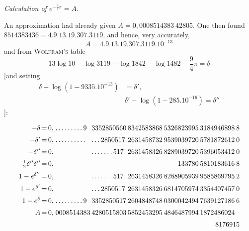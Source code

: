 \begingroup
\renewcommand{\arraystretch}{1.45}
\par{}

\begin{center}\emph{Calculation of $e^{-\frac94\pi}=A$.}\end{center}

An approximation had already given $A=0{,}0008514383\ 42805$. One then found
$8514383436=4.9.13.19.307.3119$, and hence, very accurately,
\[
A=4.9.13.19.307.3119.10^{-13}
\]
and from \textsc{Wolfram's} table
\[
13\log10-\log3119-\log1842-\log1482-\frac94\pi=\delta
\]
[and setting
\[
\begin{aligned}\delta-\log(1-9335.10^{-13})&=\delta',\\[7pt]&
\delta'-\log(1-285.10^{-16})=\delta''\end{aligned}
\]
]:

\begingroup\footnotesize\setlength{\arraycolsep}{1pt}\renewcommand{\arraystretch}{1.12}\[
\begin{array}{r@{\,=\,}r@{\;}l@{\hspace{2pt}}l@{\hspace{2pt}}l@{\hspace{2pt}}l@{\hspace{2pt}}l@{\hspace{2pt}}l}
-\delta & 0{,} & .\,.\,.\,.\,.\,.\,.\,.\,.\,9 & 3352850560 & 8342583868 & 5326823995 & 3184946898 & 8\\[5pt]
-\delta' & 0{,} & .\,.\,.\,.\,.\,.\,.\,.\,.\,. & .\,.\,.\,2850517 & 2631458732 & 9539039720 & 5781872612 & 0\\[5pt]
-\delta'' & 0{,} &  & .\,.\,.\,.\,.\,.\,.\,517 & 2631458326 & 8289039720 & 5396053412 & 0\\[5pt]
\tfrac12\delta''\delta'' & 0{,} &  &  &  & \phantom{0000}133780 & 5810183616 & 8\\[5pt]
1-e^{\delta''} & 0{,} &  & .\,.\,.\,.\,.\,.\,.\,517 & 2631458326 & 8288905939 & 9585869795 & 2\\[5pt]
1-e^{\delta'} & 0{,} &  & .\,.\,.\,2850517 & 2631458326 & 6814705974 & 3354407457 & 0\\[5pt]
1-e^\delta & 0{,} & .\,.\,.\,.\,.\,.\,.\,.\,.\,9 & 3352850517 & 2604848748 & 0300042494 & 7639127186 & 6\\[5pt]
A & 0{,} & 0008514383 & 4280515803 & 5852453295 & 4846487994 & 1872486024 & \\[5pt]
\multicolumn{2}{c}{}&\multicolumn{6}{r}{8176915}\\[5pt]
\end{array}
\]\endgroup

